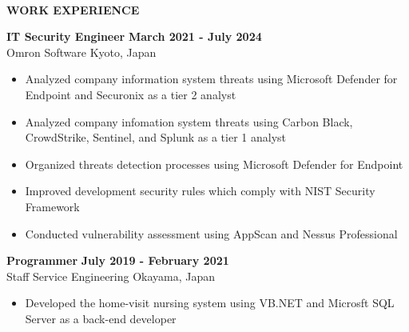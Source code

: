 \begin{flushleft}
    \hrulefill \\
    \begin{large}
        \textbf{WORK EXPERIENCE} \\
    \end{large} 
\end{flushleft}
\textbf{IT Security Engineer} \hfill \textbf{March 2021 - July 2024} \\
Omron Software \hfill Kyoto, Japan
\begin{itemize}
    \item Analyzed company information system threats using Microsoft Defender for Endpoint and Securonix as a tier 2 analyst
    \item Analyzed company infomation system threats using Carbon Black, CrowdStrike, Sentinel, and Splunk as a tier 1 analyst
    \item Organized threats detection processes using Microsoft Defender for Endpoint
    \item Improved development security rules which comply with NIST Security Framework
    \item Conducted vulnerability assessment using AppScan and Nessus Professional
\end{itemize}
\textbf{Programmer} \hfill \textbf{July 2019 - February 2021} \\
Staff Service Engineering \hfill Okayama, Japan
\begin{itemize}
    \item Developed the home-visit nursing system using VB.NET and Microsft SQL Server as a back-end developer
\end{itemize}